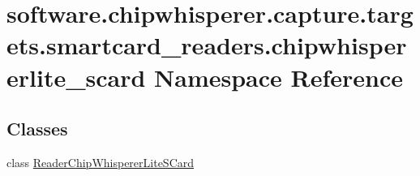 \hypertarget{namespacesoftware_1_1chipwhisperer_1_1capture_1_1targets_1_1smartcard__readers_1_1chipwhispererlite__scard}{}\section{software.\+chipwhisperer.\+capture.\+targets.\+smartcard\+\_\+readers.\+chipwhispererlite\+\_\+scard Namespace Reference}
\label{namespacesoftware_1_1chipwhisperer_1_1capture_1_1targets_1_1smartcard__readers_1_1chipwhispererlite__scard}
\subsection*{Classes}
\begin{DoxyCompactItemize}
\item 
class \hyperlink{classsoftware_1_1chipwhisperer_1_1capture_1_1targets_1_1smartcard__readers_1_1chipwhispererlite_fcbff8031d4c94f40f5e5a51a3e4a7d0}{Reader\+Chip\+Whisperer\+Lite\+S\+Card}
\end{DoxyCompactItemize}
